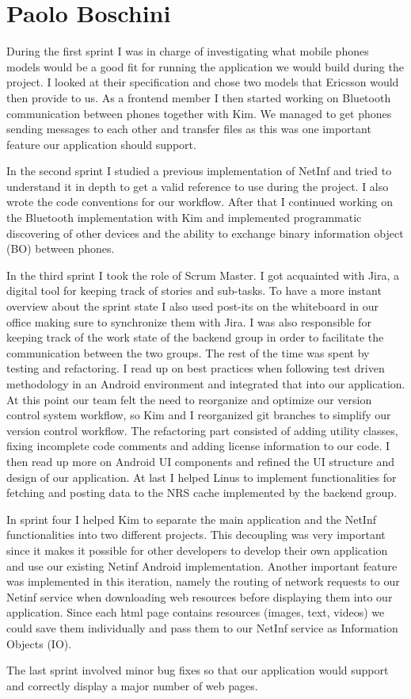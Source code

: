 \section{Paolo Boschini}
During the first sprint I was in charge of investigating what mobile phones models
would be a good fit for running the application we would build during the project.
I looked at their specification and chose two models that Ericsson would then provide to us.
As a frontend member I then started working on Bluetooth communication between phones
together with Kim. We managed to get phones sending messages to each other and transfer
files as this was one important feature our application should support.

In the second sprint I studied a previous implementation of NetInf and tried to understand
it in depth to get a valid reference to use during the project. 
I also wrote the code conventions for our workflow. After that I continued working on the Bluetooth implementation
with Kim and implemented programmatic discovering of other devices and the ability to
exchange binary information object (BO) between phones.

In the third sprint I took the role of Scrum Master. I got acquainted with Jira, a digital tool for keeping track of stories and sub-tasks.
To have a more instant overview about the sprint state I also used post-its on the whiteboard in our office making sure to synchronize them with Jira.
I was also responsible for keeping track of the work state of the backend group in order to facilitate the communication between
the two groups. The rest of the time was spent by testing and refactoring. I read up on best practices when following 
test driven methodology in an Android environment and integrated that into our application.
At this point our team felt the need to reorganize and optimize our version control system workflow,
so Kim and I reorganized git branches to simplify our version control workflow.
The refactoring part consisted of adding utility classes, fixing incomplete code comments and adding license
information to our code. I then read up more on Android UI components and refined the UI structure and design of our application.
At last I helped Linus to implement functionalities for fetching and posting data to the NRS cache implemented by the backend group.

In sprint four I helped Kim to separate the main application and the NetInf functionalities into two different projects.
This decoupling was very important since it makes it possible for other developers to develop their own application
and use our existing Netinf Android implementation.
Another important feature was implemented in this iteration, namely the routing of network requests to our Netinf service
when downloading web resources before displaying them into our application. Since each html page contains resources (images, text, videos) we could
save them individually and pass them to our NetInf service as Information Objects (IO).

The last sprint involved minor bug fixes so that our application would support and correctly display a major number of web pages.
